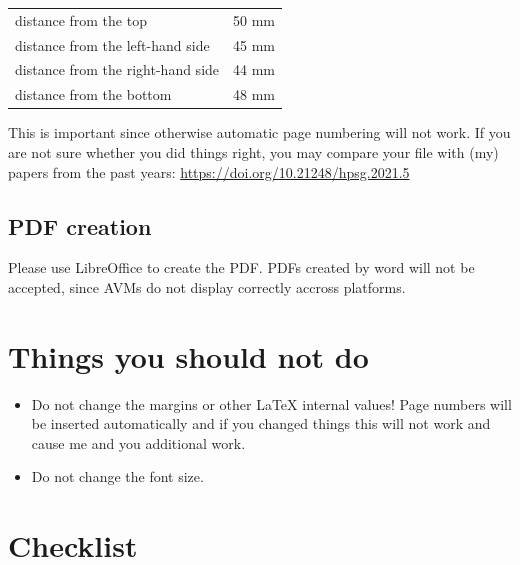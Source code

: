 \documentclass[11pt,a4paper,fleqn]{article}
\begin{document}
\begin{table}[H]
\begin{tabular}{@{}l@{ = }l}
distance from the top & 50 mm\\
distance from the left-hand side & 45 mm\\
distance from the right-hand side & 44 mm\\
distance from the bottom & 48 mm\\
\end{tabular}
\end{table}

This is important since otherwise automatic page numbering will not work.
If you are not sure whether you did things right, you may compare your file
with (my) papers from the past years:\newline 
\url{https://doi.org/10.21248/hpsg.2021.5}

\subsection{PDF creation}
\label{sec-pdf-creation-word}

Please use LibreOffice to create the PDF. PDFs created by word will not be accepted, since AVMs do
not display correctly accross platforms.

\section{Things you should not do}

\begin{itemize}
\item Do not change the margins or other \LaTeX{} internal values! Page numbers will be inserted automatically and
      if you changed things this will not work and cause me and you additional work.
\item Do not change the font size.
\end{itemize}


\section{Checklist}
\end{document}
